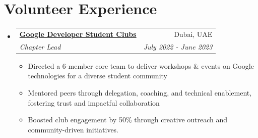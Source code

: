\documentclass[a4paper,20pt]{article}
\makeatletter
\newcommand{\resumeItemWithoutTitle}[1] {
	\item\small{
		{#1 \vspace{-2pt}}
	}
}
\newcommand{\resumeSubheading}[4] {
	\vspace{-1pt}\item
	\begin{tabular*}{0.97\textwidth}{l@{\extracolsep{\fill}}r}
		\textbf{#1} & #2 \\
		\textit{#3} & \textit{#4} \\
	\end{tabular*}\vspace{-5pt}
}
\newcommand{\resumeSubHeadingListStart}{\begin{itemize}[leftmargin=*]}
\newcommand{\resumeSubHeadingListEnd}{\end{itemize}}
\newcommand{\resumeItemListStart}{\begin{itemize}}
\newcommand{\resumeItemListEnd}{\end{itemize}\vspace{-5pt}}
\makeatother
\begin{document}
\section{Volunteer Experience}
	\resumeSubHeadingListStart
		\resumeSubheading{\href{https://gdg.community.dev/gdg-on-campus-heriot-watt-university-dubai-dubai-united-arab-emirates}{Google Developer Student Clubs}}{Dubai, UAE}{Chapter Lead}{July 2022 - June 2023}
		\resumeItemListStart
			\resumeItemWithoutTitle{Directed a 6-member core team to deliver workshops \& events on Google technologies for a diverse student community}
			\resumeItemWithoutTitle{Mentored peers through delegation, coaching, and technical enablement, fostering trust and impactful collaboration}
			\resumeItemWithoutTitle{Boosted club engagement by 50\% through creative outreach and community-driven initiatives.}
		\resumeItemListEnd
	\resumeSubHeadingListEnd

\vspace{-5pt}
\end{document}
